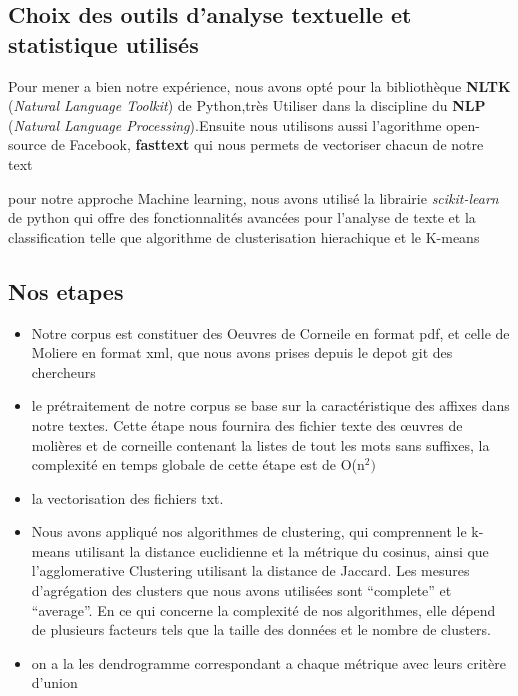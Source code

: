 \documentclass[]{report}
\begin{document}
\subsection{Choix des outils d'analyse textuelle et statistique utilisés}
\vspace{\baselineskip}
\hspace{0,5cm} Pour mener a bien notre expérience, nous avons opté pour la
bibliothèque  \textbf{NLTK} (\textit{Natural Language Toolkit}) de Python,très
Utiliser dans la discipline du \textbf{NLP} (\textit{Natural Language
Processing}).Ensuite nous utilisons aussi l'agorithme open-source de Facebook,
\textbf{fasttext} qui nous permets de vectoriser chacun de notre text

pour notre approche Machine learning, nous avons utilisé la librairie
\textit{scikit-learn} de python qui offre des fonctionnalités avancées pour
l'analyse de texte et la classification telle que algorithme de clusterisation
hierachique et le K-means 
\subsection{Nos etapes } 

\begin{itemize}
\item Notre corpus est constituer des Oeuvres de Corneile en format pdf, et
celle de Moliere  en format xml, que nous avons prises depuis le depot git des
chercheurs 
\item le prétraitement de notre corpus se base sur la caractéristique des
affixes dans notre textes. Cette étape nous fournira des fichier texte des
œuvres de molières et de corneille contenant la listes de tout les mots sans
suffixes, la complexité en temps globale de cette étape est de O(n\(^2)\)
\item la vectorisation des fichiers txt.
\item Nous avons appliqué nos algorithmes de clustering, qui comprennent le
k-means utilisant la distance euclidienne et la métrique du cosinus, ainsi que
l'agglomerative Clustering utilisant la distance de Jaccard. Les mesures
d'agrégation des clusters que nous avons utilisées sont ``complete'' et
``average''. En ce qui concerne la complexité de nos algorithmes, elle dépend de
plusieurs facteurs tels que la taille des données et le nombre de clusters. 
\item  on a la les dendrogramme correspondant a chaque métrique avec leurs
critère d'union
\end{itemize}
\end{document}
